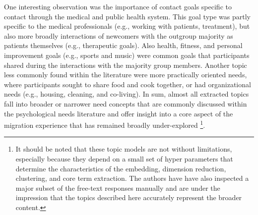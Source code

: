 One interesting observation was the importance of contact goals specific
to contact through the medical and public health system. This goal type
was partly specific to the medical professionals (e.g., working with
patients, treatment), but also more broadly interactions of newcomers
with the outgroup majority as patients themselves (e.g., therapeutic
goals). Also health, fitness, and personal improvement goals (e.g.,
sports and music) were common goals that participants shared during the
interactions with the majority group members. Another topic less
commonly found within the literature were more practically oriented
needs, where participants sought to share food and cook together, or had
organizational needs (e.g., housing, cleaning, and co-living). In sum,
almost all extracted topics fall into broader or narrower need concepts
that are commonly discussed within the psychological needs literature
\citep[e.g.,][]{Orehek2018a} and offer insight into a core aspect of the
migration experience that has remained broadly under-explored
\citep[][]{Kreienkamp2022d}\footnote{It should be noted that these topic models are not without limitations, especially because they depend on a small set of hyper parameters that determine the characteristics of the embedding, dimension reduction, clustering, and core term extraction. The authors have have also inspected a major subset of the free-text responses manually and are under the impression that the topics described here accurately represent the broader content.}.
